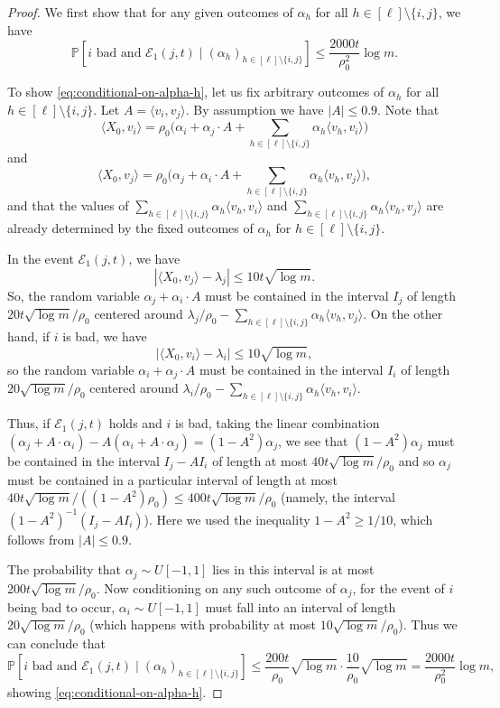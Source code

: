 \documentclass[10pt,a4paper]{amsart}
\newcommand{\ang}[1]{\langle#1\rangle}
\newcommand{\cE}{\mathcal E}
\renewcommand{\P}{\mathbb{P}}
\renewcommand{\ge}{\geqslant}
\renewcommand{\le}{\leqslant}
\begin{document}
\begin{proof}
We first show that for any given outcomes of $\alpha_h$ for all $h\in [\ell]\setminus\{i,j\}$, we have
\begin{equation}\label{eq:conditional-on-alpha-h}
\P[i\text{ bad}\text{ and }\cE_1(j,t) \mid (\alpha_h)_{h\in [\ell]\setminus\{i,j\}}]\le  \frac{2000t}{\rho_0^2}\log m.
\end{equation}

To show \eqref{eq:conditional-on-alpha-h}, let us fix arbitrary outcomes of $\alpha_h$ for all $h\in [\ell]\setminus\{i,j\}$. Let $A = \ang{v_i, v_j}$. By assumption we have $|A|\le 0.9$. Note that 
\[\ang{X_0, v_i} = \rho_0\Big(\alpha_i + \alpha_j\cdot A + \sum_{h \in [\ell]\setminus\{i,j\}}\alpha_h\ang{v_h, v_i}\Big)\]
and 
\[\ang{X_0, v_j} = \rho_0\Big(\alpha_j + \alpha_i\cdot A + \sum_{h \in [\ell]\setminus\{i,j\}}\alpha_h\ang{v_h, v_j}\Big),\]
and that the values of $\sum_{h \in [\ell]\setminus\{i,j\}}\alpha_h\ang{v_h, v_i}$ and $\sum_{h \in [\ell]\setminus\{i,j\}}\alpha_h\ang{v_h, v_j}$ are already determined by the fixed outcomes of $\alpha_h$ for $h\in [\ell]\setminus\{i,j\}$.

In the event $\cE_1(j,t)$, we have
\[|\ang{X_0,v_j} - \lambda_j|\le 10t\sqrt{\log m}.\]
So, the random variable $\alpha_j + \alpha_i\cdot A$ must be contained in the interval $I_j$ of length $20t\sqrt{\log m}/\rho_0$ centered around $\lambda_j/\rho_0 - \sum_{h \in [\ell]\setminus\{i,j\}}\alpha_h\ang{v_h, v_j}$. On the other hand, if $i$ is bad, we have 
\[|\ang{X_0, v_i} - \lambda_i| \le 10\sqrt{\log m},\]
so the random variable $\alpha_i + \alpha_j\cdot A$ must be contained in the interval $I_i$ of length $20\sqrt{\log m}/\rho_0$ centered around $\lambda_i/\rho_0 - \sum_{h \in [\ell]\setminus\{i,j\}}\alpha_h\ang{v_h, v_i}$. 

Thus, if $\cE_1(j,t)$ holds and $i$ is bad, taking the linear combination $(\alpha_j + A\cdot \alpha_i) - A(\alpha_i + A\cdot \alpha_j) = (1- A^2 )\alpha_j$, we see that $(1- A^2 )\alpha_j$ must be contained in the interval $I_j-AI_i$ of length at most $40t\sqrt{\log m}/\rho_0$ and so $\alpha_j$ must be contained in a particular interval of length at most $40t\sqrt{\log m}/((1-A^2)\rho_0)\le 400t\sqrt{\log m}/\rho_0$ (namely, the interval $(1- A^2 )^{-1}(I_j-AI_i)$). Here we used the inequality $1-A^2\ge 1/10$, which follows from $|A|\le 0.9$.

The probability that $\alpha_j\sim U[-1,1]$ lies in this interval is at most $200t\sqrt{\log m}/\rho_0$. Now conditioning on any such outcome of $\alpha_j$, for the event of $i$ being bad to occur, $\alpha_i\sim U[-1,1]$ must fall into an interval of length $20\sqrt{\log m}/\rho_0$ (which happens with probability at most $10\sqrt{\log m}/\rho_0$). Thus we can conclude that 
\[\P[i\text{ bad}\text{ and }\cE_1(j,t)\mid (\alpha_h)_{h\in [\ell]\setminus\{i,j\}}]\le  \frac{200t}{\rho_0}\sqrt{\log m}\cdot \frac{10}{\rho_0}\sqrt{\log m}=\frac{2000t}{\rho_0^2}\log m,\]
showing \eqref{eq:conditional-on-alpha-h}.


\end{proof}
\end{document}
